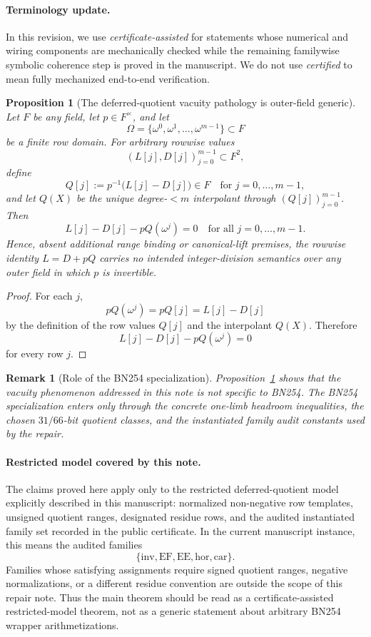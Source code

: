﻿\documentclass[11pt]{article}
\newtheorem{proposition}[theorem]{Proposition}
\newtheorem{remark}[theorem]{Remark}
\begin{document}
\paragraph{Terminology update.}
In this revision, we use \emph{certificate-assisted} for statements whose
numerical and wiring components are mechanically checked while the remaining
familywise symbolic coherence step is proved in the manuscript. We do not use
\emph{certified} to mean fully mechanized end-to-end verification.

\begin{proposition}[The deferred-quotient vacuity pathology is outer-field generic]
\label{prop:outer-field-generic-vacuity}
Let \(F\) be any field, let \(p\in F^\times\), and let
\[
\Omega=\{\omega^0,\omega^1,\dots,\omega^{m-1}\}\subset F
\]
be a finite row domain. For arbitrary rowwise values
\[
(L[j],D[j])_{j=0}^{m-1}\subset F^2,
\]
define
\[
Q[j]:=p^{-1}\bigl(L[j]-D[j]\bigr)\in F
\quad\text{for }j=0,\dots,m-1,
\]
and let \(Q(X)\) be the unique degree-\(<m\) interpolant through
\((Q[j])_{j=0}^{m-1}\). Then
\[
L[j]-D[j]-pQ(\omega^j)=0
\quad\text{for all }j=0,\dots,m-1.
\]
Hence, absent additional range binding or canonical-lift premises, the rowwise
identity \(L=D+pQ\) carries no intended integer-division semantics over any
outer field in which \(p\) is invertible.
\end{proposition}

\begin{proof}
For each \(j\),
\[
pQ(\omega^j)=pQ[j]=L[j]-D[j]
\]
by the definition of the row values \(Q[j]\) and the interpolant \(Q(X)\).
Therefore
\[
L[j]-D[j]-pQ(\omega^j)=0
\]
for every row \(j\).
\end{proof}

\begin{remark}[Role of the BN254 specialization]
\label{rem:bn254-parameter-role}
Proposition~\ref{prop:outer-field-generic-vacuity} shows that the vacuity
phenomenon addressed in this note is not specific to BN254. The BN254
specialization enters only through the concrete one-limb headroom inequalities,
the chosen \(31/66\)-bit quotient classes, and the instantiated family audit
constants used by the repair.
\end{remark}

\paragraph{Restricted model covered by this note.}
The claims proved here apply only to the restricted deferred-quotient model
explicitly described in this manuscript: normalized non-negative row templates,
unsigned quotient ranges, designated residue rows, and the audited instantiated
family set recorded in the public certificate. In the current manuscript
instance, this means the audited families
\[
\{\mathrm{inv},\mathrm{EF},\mathrm{EE},\mathrm{hor},\mathrm{car}\}.
\]
Families whose satisfying assignments require signed quotient ranges, negative
normalizations, or a different residue convention are outside the scope of this
repair note. Thus the main theorem should be read as a certificate-assisted
restricted-model theorem, not as a generic statement about arbitrary BN254
wrapper arithmetizations.
\end{document}
